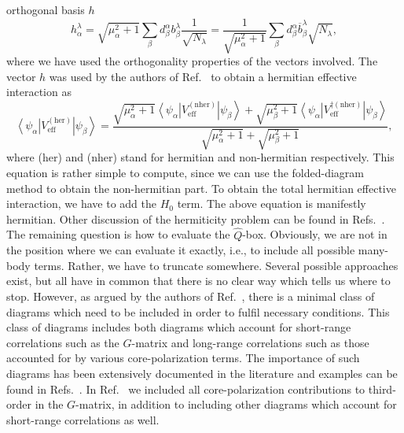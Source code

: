 \documentclass[twoside,12pt]{article}
\begin{document}
orthogonal basis $h$
\begin{equation}
  h_{\alpha}^{\lambda}=\sqrt{\mu_{\alpha}^2+1}\sum_{\beta}
  d_{\beta}^{\alpha}b_{\beta}^{\lambda}\frac{1}{\sqrt{N_{\lambda}}}
  =\frac{1}{\sqrt{\mu_{\alpha}^2+1}}\sum_{\beta}
  d_{\beta}^{\alpha}\overline{b}_{\beta}^{\lambda}\sqrt{N_{\lambda}},
  \label{eq:hbasis}
\end{equation}
where we have used the orthogonality properties of the vectors
involved. The vector $h$ was used by the authors of Ref.\ \cite{kehlsok93}
to obtain a hermitian effective interaction as
\begin{equation}
   \left\langle \psi_{\alpha}\right |
   V_{\mathrm{eff}}^{\mathrm{(her)}}\left | \psi_{\beta}\right\rangle=
   \frac{\sqrt{\mu_{\alpha}^2+1}\left\langle \psi_{\alpha} \right |
   V_{\mathrm{eff}}^{\mathrm{(nher)}}\left | \psi_{\beta}\right\rangle
   +\sqrt{\mu_{\beta}^2+1}\left\langle \psi_{\alpha}\right |
   V_{\mathrm{eff}}^{\dagger\mathrm{(nher)}}\left |
   \psi_{\beta} \right\rangle}
   {\sqrt{\mu_{\alpha}^2+1}+\sqrt{\mu_{\beta}^2+1} },
   \label{eq:hermitian}
\end{equation}
where (her) and (nher) stand for hermitian and non-hermitian
respectively.
This equation is rather simple to compute, since
we can use the folded-diagram method
to obtain the non-hermitian part.
To obtain the total hermitian effective interaction, we have to
add the $H_0$ term. The above equation is manifestly hermitian.
Other discussion of the hermiticity problem can be found
in Refs.\ \cite{lm85,arponen97}.
The remaining question is how to evaluate the $\hat{Q}$-box.
Obviously, we are not in the position where we can evaluate it
exactly, i.e., to include all possible many-body terms.
Rather, we have to truncate somewhere.
Several possible approaches exist, but all have in common that
there is no clear way which tells us where to stop.
However, as argued by the authors of Ref.\ \cite{jls82}, there is a
minimal class of diagrams which need to be included
in order to fulfil necessary conditions. This class
of diagrams includes both diagrams which account for short-range
correlations such as the $G$-matrix and long-range
correlations such as those accounted for by various
core-polarization terms.
The importance of such diagrams has been extensively documented
in the literature and examples can be found
in Refs.\ \cite{hko95,eo77}. In Ref.\ \cite{hko95} we included
all core-polarization contributions to third-order
in the $G$-matrix, in addition to including other diagrams
which account for short-range correlations as well.
\end{document}
